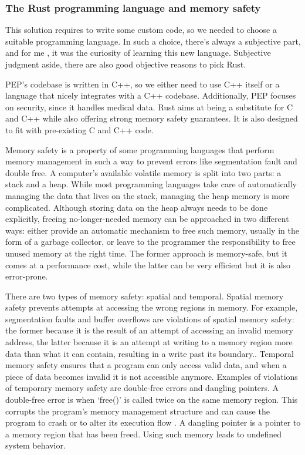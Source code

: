 \documentclass{report}
\begin{document}
\subsubsection{The Rust programming language and memory safety}
This solution requires to write some custom code, so we needed to choose a suitable programming language. In such a choice, there's always a subjective part, and for me , it was
the curiosity of learning this new language. Subjective judgment aside, there are also good objective reasons to pick Rust. \par
PEP's codebase is written in C++, so we either need to use C++ itself or a language that nicely integrates with a C++ codebase. Additionally, PEP focuses on security, since it
handles medical data. Rust aims at being a substitute for C and C++ while also offering strong memory safety guarantees. It is also designed to fit with pre-existing C and C++
code. \par
Memory safety is a property of some programming languages that perform memory management in such a way to prevent errors like segmentation fault and double free. A computer's
available volatile memory is split into two parts: a stack and a heap. While most programming languages take care of automatically managing the data that lives on the stack,
managing the heap memory is more complicated. Although storing data on the heap always needs to be done explicitly, freeing no-longer-needed memory can be approached in two
different ways: either provide an automatic mechanism to free such memory, usually in the form of a garbage collector, or leave to the programmer the responsibility to free unused
memory at the right time. The former approach is memory-safe, but it comes at a performance cost, while the latter can be very efficient but it is also error-prone. \par
There are two types of memory safety: spatial and temporal. Spatial memory safety prevents attempts at accessing the wrong regions in memory. For example, segmentation faults and
buffer overflows are violations of spatial memory safety: the former because it is the result of an attempt of accessing an invalid memory address, the latter because it is an
attempt at writing to a memory region more data than what it can contain, resulting in a write past its boundary.. Temporal memory safety ensures that a program
can only access valid data, and when a piece of data becomes invalid it is not accessible anymore. Examples of violations of temporary memory safety are double-free errors and
dangling pointers. A double-free error is when \enquote*{free()} is called twice on the same memory region. This corrupts the program's memory management structure and can cause
the program to crash or to alter its execution flow \cite{double-free}. A dangling pointer is a pointer to a memory region that has been freed. Using such memory leads to undefined
system behavior. \par
\end{document}
